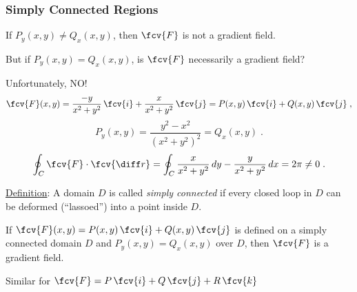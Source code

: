 \begin{frame}
  \frametitle{Simply Connected Regions}

  If $P_y(x,y) \neq Q_x(x,y)$, then \pause $\fcv{F}$ is not a gradient field.

  \pause But if $P_y(x,y) = Q_x(x,y)$, is $\fcv{F}$ necessarily a gradient field?

  \pause Unfortunately, NO!
%
$$\fcv{F}(x,y) = \frac{-y}{x^2+y^2} \, \fcv{i} + \frac{x}{x^2+y^2} \, \fcv{j} = P(x,y) \, \fcv{i} + Q(x,y)\, \fcv{j}\; ,$$
%
$$P_y(x,y) = \frac{y^2-x^2}{(x^2+y^2)^2} = Q_x(x,y) \; .$$
%
$$\oint_C \fcv{F} \cdot \fcv{\diff r} = \oint_C \frac{x}{x^2+y^2} \, dy - \frac{y}{x^2+y^2}\, dx = 2\pi \neq 0 \; .$$

\pause \underline{Definition}: A domain $D$ is called \emph{simply connected} if every closed loop in $D$ can be deformed (``lassoed'') into a point inside $D$.

\medskip

If $\fcv{F}(x,y)=P(x,y) \, \fcv{i} + Q(x,y) \, \fcv{j}$ is defined on a simply connected domain $D$ and $P_y(x,y)=Q_x(x,y)$ over $D$, then $\fcv{F}$ is a gradient field.

Similar for $\fcv{F} = P \, \fcv{i} + Q\, \fcv{j} + R\, \fcv{k}$
\end{frame}